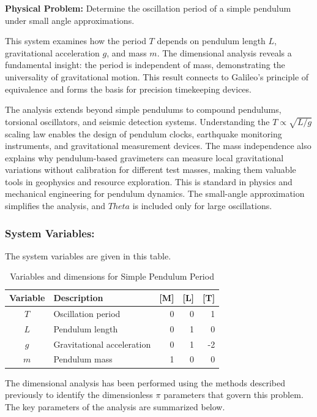\begin{problembox}
\textbf{Physical Problem:} Determine the oscillation period of a simple pendulum under small angle approximations.
\end{problembox}
\begin{codebox}
This system examines how the period $T$ depends on pendulum length $L$, gravitational acceleration $g$, and mass $m$. The dimensional analysis reveals a fundamental insight: the period is independent of mass, demonstrating the universality of gravitational motion. This result connects to Galileo's principle of equivalence and forms the basis for precision timekeeping devices.

The analysis extends beyond simple pendulums to compound pendulums, torsional oscillators, and seismic detection systems. Understanding the $T \propto \sqrt{L/g}$ scaling law enables the design of pendulum clocks, earthquake monitoring instruments, and gravitational measurement devices. The mass independence also explains why pendulum-based gravimeters can measure local gravitational variations without calibration for different test masses, making them valuable tools in geophysics and resource exploration.  This is standard in physics and mechanical engineering for pendulum dynamics. The small-angle approximation simplifies the analysis, and $Theta$ is included only for large oscillations.
\end{codebox}
\subsubsection*{System Variables: } The system variables are given in this table.

\begin{table}[htpb]
\centering
\begin{tabular}{|c|l|r|r|r|}
\hline
\textbf{Variable} & \textbf{Description} & \textbf{[M]} & \textbf{[L]} & \textbf{[T]} \\
\hline
$T$ & Oscillation period & 0 & 0 & 1 \\
$L$ & Pendulum length & 0 & 1 & 0 \\
$g$ & Gravitational acceleration & 0 & 1 & -2 \\
$m$ & Pendulum mass & 1 & 0 & 0 \\
\hline
\end{tabular}
\caption{Variables and dimensions for Simple Pendulum Period}
\end{table}

The dimensional analysis has been performed using the methods described previously to identify the dimensionless $\pi$ parameters that govern this problem. The key parameters of the analysis are summarized below.

